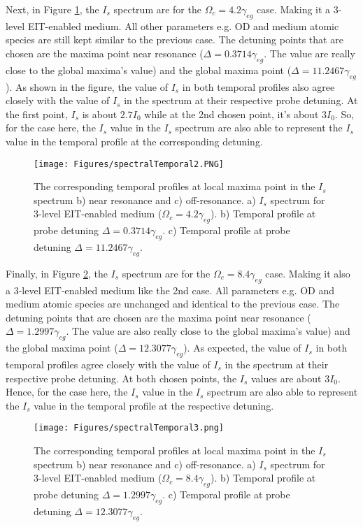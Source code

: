 Next, in Figure \ref{fig: corresponding temporal profile 2}, the $I_{s}$ spectrum are for the $\Omega_{c} = 4.2\gamma_{eg}$ case. Making it a 3-level EIT-enabled medium. All other parameters e.g. OD and medium atomic species are still kept similar to the previous case. The detuning points that are chosen are the maxima point near resonance ($\Delta = 0.3714\gamma_{eg}$. The value are really close to the global maxima's value) and the global maxima point ($\Delta = 11.2467\gamma_{eg}$). As shown in the figure, the value of $I_{s}$ in both temporal profiles also agree closely with the value of $I_{s}$ in the spectrum at their respective probe detuning. At the first point, $I_{s}$ is about $2.7I_{0}$ while at the 2nd chosen point, it's about $3I_{0}$. So, for the case here, the $I_{s}$ value in the $I_{s}$ spectrum are also able to represent the $I_{s}$ value in the temporal profile at the corresponding detuning.

\begin{figure}[h!]
    \centering
     \texttt{[image: Figures/spectralTemporal2.PNG]}
    \caption{The corresponding temporal profiles at local maxima point in the $I_{s}$ spectrum b) near resonance and c) off-resonance. a) $I_{s}$ spectrum for 3-level EIT-enabled medium ($\Omega_{c} = 4.2\gamma_{eg}$). b) Temporal profile at probe detuning $\Delta = 0.3714\gamma_{eg}$. c) Temporal profile at probe detuning $\Delta = 11.2467\gamma_{eg}$.}
    \label{fig: corresponding temporal profile 2}
\end{figure}

Finally, in Figure \ref{fig: corresponding temporal profile 3}, the $I_{s}$ spectrum are for the $\Omega_{c} = 8.4\gamma_{eg}$ case. Making it also a 3-level EIT-enabled medium like the 2nd case. All parameters e.g. OD and medium atomic species are unchanged and identical to the previous case. The detuning points that are chosen are the maxima point near resonance ($\Delta = 1.2997\gamma_{eg}$. The value are also really close to the global maxima's value) and the global maxima point ($\Delta = 12.3077\gamma_{eg}$). As expected, the value of $I_{s}$ in both temporal profiles agree closely with the value of $I_{s}$ in the spectrum at their respective probe detuning. At both chosen points, the $I_{s}$ values are about $3I_{0}$. Hence, for the case here, the $I_{s}$ value in the $I_{s}$ spectrum are also able to represent the $I_{s}$ value in the temporal profile at the respective detuning.

\begin{figure}[h!]
    \centering
    \texttt{[image: Figures/spectralTemporal3.png]}
    \caption{The corresponding temporal profiles at local maxima point in the $I_{s}$ spectrum b) near resonance and c) off-resonance. a) $I_{s}$ spectrum for 3-level EIT-enabled medium ($\Omega_{c} = 8.4\gamma_{eg}$). b) Temporal profile at probe detuning $\Delta = 1.2997\gamma_{eg}$. c) Temporal profile at probe detuning $\Delta = 12.3077\gamma_{eg}$.}
    \label{fig: corresponding temporal profile 3}
\end{figure}

